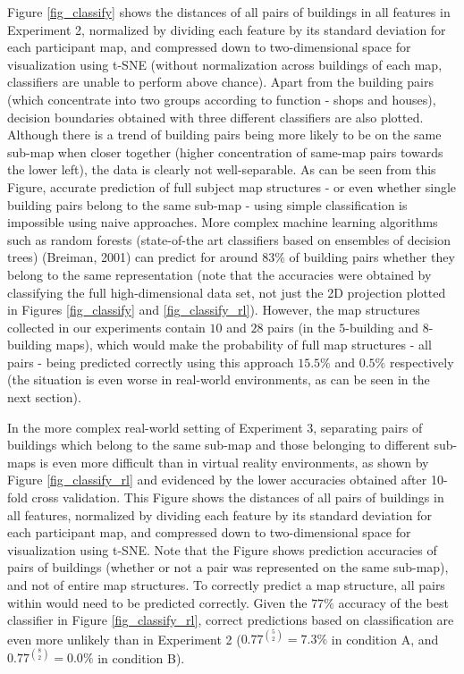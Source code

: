 Figure \ref{fig_classify} shows the distances of all pairs of buildings in all features in Experiment 2, normalized by dividing each feature by its standard deviation for each participant map, and compressed down to two-dimensional space for visualization using t-SNE (without normalization across buildings of each map, classifiers are unable to perform above chance). Apart from the building pairs (which concentrate into two groups according to function - shops and houses), decision boundaries obtained with three different classifiers are also plotted. Although there is a trend of building pairs being more likely to be on the same sub-map when closer together (higher concentration of same-map pairs towards the lower left), the data is clearly not well-separable. As can be seen from this Figure, accurate prediction of full subject map structures - or even whether single building pairs belong to the same sub-map - using simple classification is impossible using naive approaches. More complex machine learning algorithms such as random forests (state-of-the art classifiers based on ensembles of decision trees) (Breiman, 2001) can predict for around $83 \%$ of building pairs whether they belong to the same representation (note that the accuracies were obtained by classifying the full high-dimensional data set, not just the 2D projection plotted in Figures \ref{fig_classify} and \ref{fig_classify_rl}). However, the map structures collected in our experiments contain $10$ and $28$ pairs (in the $5$-building and $8$-building maps), which would make the probability of full map structures - all pairs - being predicted correctly using this approach $15.5 \%$ and $0.5 \%$ respectively (the situation is even worse in real-world environments, as can be seen in the next section).

In the more complex real-world setting of Experiment 3, separating pairs of buildings which belong to the same sub-map and those belonging to different sub-maps is even more difficult than in virtual reality environments, as shown by Figure \ref{fig_classify_rl} and evidenced by the lower accuracies obtained after 10-fold cross validation. This Figure shows the distances of all pairs of buildings in all features, normalized by dividing each feature by its standard deviation for each participant map, and compressed down to two-dimensional space for visualization using t-SNE. Note that the Figure shows prediction accuracies of pairs of buildings (whether or not a pair was represented on the same sub-map), and not of entire map structures. To correctly predict a map structure, all pairs within would need to be predicted correctly. Given the $77 \%$ accuracy of the best classifier in Figure \ref{fig_classify_rl}, correct predictions based on classification are even more unlikely than in Experiment 2 ($0.77^{5 \choose 2}=7.3 \%$ in condition A, and $0.77^{8 \choose 2}=0.0 \%$ in condition B).

